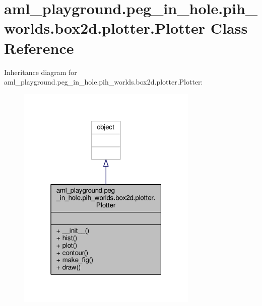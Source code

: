 \hypertarget{classaml__playground_1_1peg__in__hole_1_1pih__worlds_1_1box2d_1_1plotter_1_1_plotter}{\section{aml\-\_\-playground.\-peg\-\_\-in\-\_\-hole.\-pih\-\_\-worlds.\-box2d.\-plotter.\-Plotter Class Reference}
\label{classaml__playground_1_1peg__in__hole_1_1pih__worlds_1_1box2d_1_1plotter_1_1_plotter}
}


Inheritance diagram for aml\-\_\-playground.\-peg\-\_\-in\-\_\-hole.\-pih\-\_\-worlds.\-box2d.\-plotter.\-Plotter\-:
\nopagebreak
\begin{figure}[H]
\begin{center}
\leavevmode
\includegraphics[width=244pt]{classaml__playground_1_1peg__in__hole_1_1pih__worlds_1_1box2d_1_1plotter_1_1_plotter__inherit__graph}
\end{center}
\end{figure}


